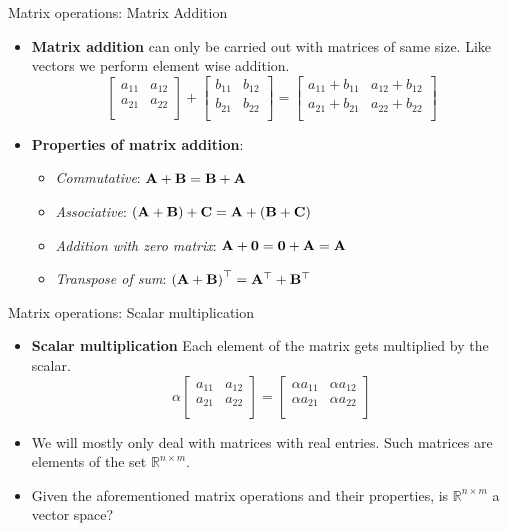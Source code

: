 \documentclass[aspectratio=169]{beamer}
\begin{document}
\begin{frame}[t]{Matrix operations: Matrix Addition}
  \begin{itemize}
    \item \textbf{Matrix addition} can only be carried out with matrices of same size. Like vectors we perform element wise addition.
    \[ \begin{bmatrix}
      a_{11} & a_{12}\\
      a_{21} & a_{22}\\
    \end{bmatrix} + \begin{bmatrix}
      b_{11} & b_{12}\\
      b_{21} & b_{22}\\
    \end{bmatrix} = \begin{bmatrix}
      a_{11} + b_{11} & a_{12} + b_{12}\\
      a_{21} + b_{21} & a_{22} + b_{22}\\
    \end{bmatrix}\]
    
    \item \textbf{Properties of matrix addition}:
    \begin{itemize}
      \item \textit{Commutative}: $\mathbf{A} + \mathbf{B} = \mathbf{B} + \mathbf{A}$
      \item \textit{Associative}: $\left(\mathbf{A} + \mathbf{B}\right) + \mathbf{C} = \mathbf{A} + \left(\mathbf{B} + \mathbf{C}\right)$
      \item \textit{Addition with zero matrix}: $\mathbf{A} + \mathbf{0} = \mathbf{0} + \mathbf{A} = \mathbf{A}$
      \item \textit{Transpose of sum}: $\left(\mathbf{A} + \mathbf{B}\right)^{\top} = \mathbf{A}^{\top} + \mathbf{B}^{\top}$
    \end{itemize}
  \end{itemize}
\end{frame}

\begin{frame}[t]{Matrix operations: Scalar multiplication}
  \begin{itemize}
    \item \textbf{Scalar multiplication} Each element of the matrix gets multiplied by the scalar.
    \[ \alpha \begin{bmatrix}
      a_{11} & a_{12}\\
      a_{21} & a_{22}\\
    \end{bmatrix} = \begin{bmatrix}
      \alpha a_{11} & \alpha a_{12} \\
      \alpha a_{21} & \alpha a_{22} \\
    \end{bmatrix}\]
    \item We will mostly only deal with matrices with real entries. Such matrices are elements of the set $\mathbb{R}^{n\times m}$.
    \item Given the aforementioned matrix operations and their properties, is $\mathbb{R}^{n\times m}$ a vector space?
  \end{itemize}
\end{frame}
\end{document}
